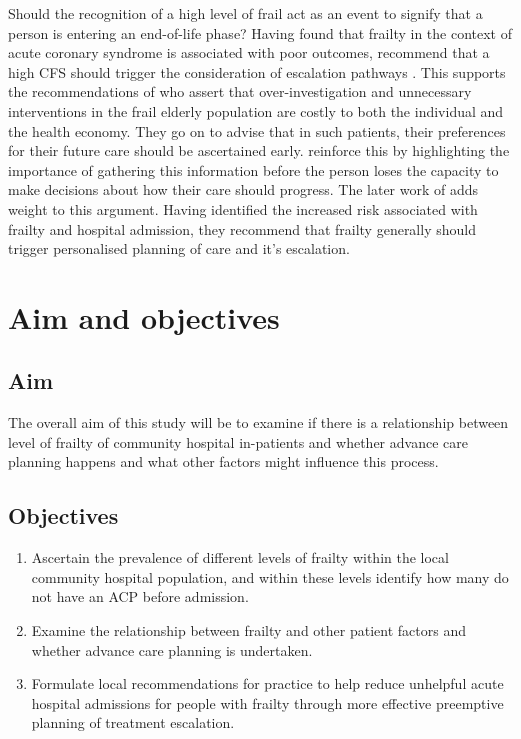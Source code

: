 \documentclass
[
	12pt,
	a4paper,
	oneside,
]{article}
\begin{document}
Should the recognition of a high level of frail act as an event to signify
that a person is entering an end-of-life phase? Having found that frailty in the 
context of acute coronary syndrome is associated
with poor outcomes, \textcite{kang:15} recommend that a high CFS should
trigger the consideration of escalation pathways \parencite{kang:15}.
This supports the recommendations of \textcite{silver:12} who assert that over-investigation
and unnecessary interventions in the frail elderly population are costly to both the
individual and the health economy. They go on to advise that in such patients, 
their preferences for their future care should be ascertained early. \textcite{oliver:14} 
reinforce this by highlighting the importance of gathering this information
before the person loses the capacity to make decisions about how their care should
progress. The later work of \textcite{romero-ortuno:16} adds weight to this argument.
Having identified the increased risk associated with frailty and hospital admission, 
they recommend that frailty generally should trigger personalised planning of
care and it's escalation.

\section{Aim and objectives}

\subsection{Aim}
The overall aim of this study will be to examine if there is a relationship between
level of frailty of community hospital in-patients and whether advance care planning
happens and what other factors might influence this process.

\subsection{Objectives}

\begin{enumerate}
\item	Ascertain the prevalence of different levels of frailty within the local community
		hospital population, and within these levels identify how many do not have
		an ACP before admission.\label{obj:prevalence}
\item	Examine the relationship between frailty and other patient factors and
		whether advance care planning is undertaken.\label{obj:association}
\item	Formulate local recommendations for practice to help reduce unhelpful
		acute hospital admissions for people with frailty through more effective
		preemptive planning of treatment escalation.
\end{enumerate}
\end{document}
